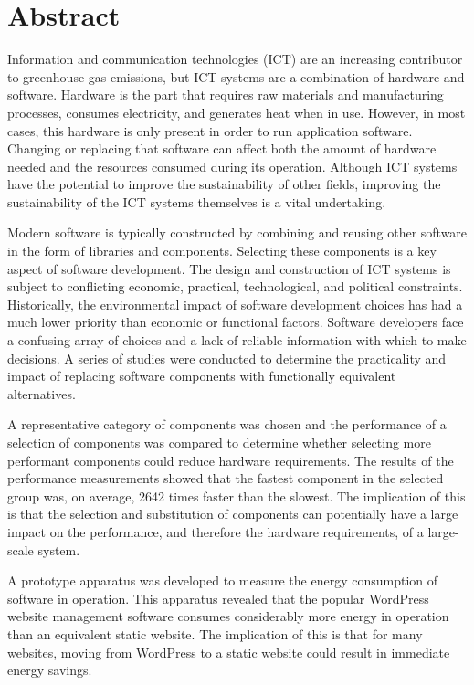 \newpage
\thispagestyle{empty}
\chapter*{Abstract}
\label{chapter:abstract}

Information and communication technologies (ICT) are an increasing contributor to greenhouse gas emissions, but ICT systems are a combination of hardware and software. Hardware is the part that requires raw materials and manufacturing processes, consumes electricity, and generates heat when in use. However, in most cases, this hardware is only present in order to run application software. Changing or replacing that software can affect both the amount of hardware needed and the resources consumed during its operation. Although ICT systems have the potential to improve the sustainability of other fields, improving the sustainability of the ICT systems themselves is a vital undertaking.

Modern software is typically constructed by combining and reusing other software in the form of libraries and components. Selecting these components is a key aspect of software development. The design and construction of ICT systems is subject to conflicting economic, practical, technological, and political constraints. Historically, the environmental impact of software development choices has had a much lower priority than economic or functional factors. Software developers face a confusing array of choices and a lack of reliable information with which to make decisions. A series of studies were conducted to determine the practicality and impact of replacing software components with functionally equivalent alternatives.

A representative category of components was chosen and the performance of a selection of components was compared to determine whether selecting more performant components could reduce hardware requirements. The results of the performance measurements showed that the fastest component in the selected group was, on average, 2642 times faster than the slowest. The implication of this is that the selection and substitution of components can potentially have a large impact on the performance, and therefore the hardware requirements, of a large-scale system.

A prototype apparatus was developed to measure the energy consumption of software in operation. This apparatus revealed that the popular WordPress website management software consumes considerably more energy in operation than an equivalent static website. The implication of this is that for many websites, moving from WordPress to a static website could result in immediate energy savings.

